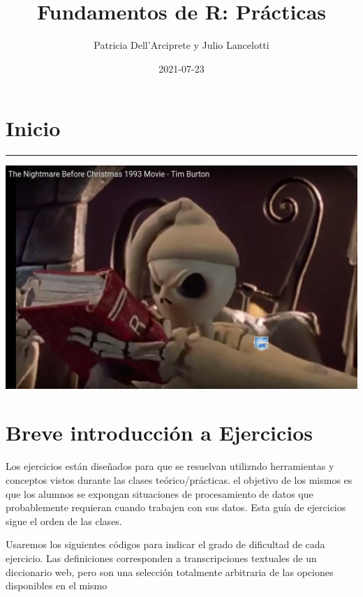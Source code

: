 \documentclass[]{book}
\title{Fundamentos de R: Prácticas}
\author{Patricia Dell'Arciprete y Julio Lancelotti}
\date{2021-07-23}
\begin{document}
\maketitle

{
\setcounter{tocdepth}{1}
\tableofcontents
}
\hypertarget{inicio}{%
\chapter*{Inicio}\label{inicio}}

\begin{center}\rule{0.5\linewidth}{0.5pt}\end{center}

\begin{center}\includegraphics[width=1\linewidth]{figuras/jack} \end{center}

\hypertarget{breve-introducciuxf3n-a-ejercicios}{%
\chapter*{Breve introducción a Ejercicios}\label{breve-introducciuxf3n-a-ejercicios}}

Los ejercicios están diseñados para que se resuelvan utilizndo herramientas y conceptos vistos durante las clases teórico/prácticas. el objetivo de los mismos es que los alumnos se expongan situaciones de procesamiento de datos que probablemente requieran cuando trabajen con sus datos. Esta guía de ejercicios sigue el orden de las clases.

Usaremos los siguientes códigos para indicar el grado de dificultad de cada ejercicio. Las definiciones corresponden a transcripciones textuales de un diccionario web, pero son una selección totalmente arbitraria de las opciones disponibles en el mismo
\end{document}
